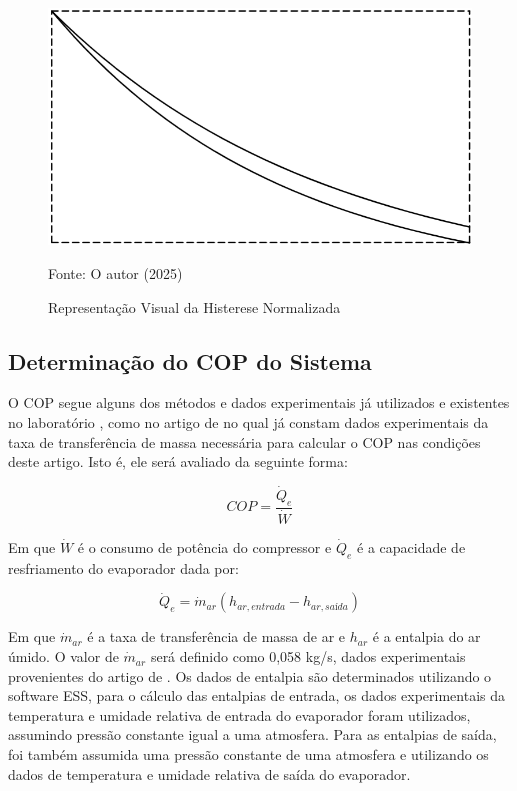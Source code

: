 \begin{figure}[h]
    \centering
    \includegraphics[width=0.75\linewidth]{FigurasdoTexto/Representação visual da histerese.png}
    \caption{Representação Visual da Histerese Normalizada}
    \label{fig:representação visual da histerese normalizada}
    {\footnotesize Fonte: O autor (2025)}
\end{figure}


\subsection{Determinação do COP do Sistema} \label{subsec:Determinação do COP do Sistema}

O COP segue alguns dos métodos e dados experimentais já utilizados e existentes no laboratório \textcite{reve2023}, como no artigo de \cite{ExperimentalThermalPerformance} no qual já constam dados experimentais da taxa de transferência de massa necessária para calcular o COP nas condições deste artigo. Isto é, ele será avaliado da seguinte forma:

\begin{equation}
    COP = \frac{\dot Q_e}{\dot W}
\end{equation}

Em que $\dot W$ é o consumo de potência do compressor e $ \dot Q_e$ é a capacidade de resfriamento do evaporador dada por:

\begin{equation}
    \dot Q_e = \dot m_{ar}(h_{ar,entrada} - h_{ar,saída})
\end{equation}

Em que $\dot m_{ar}$ é a taxa de transferência de massa de ar e $h_{ar}$ é a entalpia do ar úmido. O valor de $\dot m_{ar}$ será definido como 0,058 kg/s, dados experimentais provenientes do artigo de \textcite{ExperimentalThermalPerformance}. Os dados de entalpia são determinados utilizando o software ESS, para o cálculo das entalpias de entrada, os dados experimentais da temperatura e umidade relativa de entrada do evaporador foram utilizados, assumindo pressão constante igual a uma atmosfera. Para as entalpias de saída, foi também assumida uma pressão constante de uma atmosfera e utilizando os dados de temperatura e umidade relativa de saída do evaporador. 